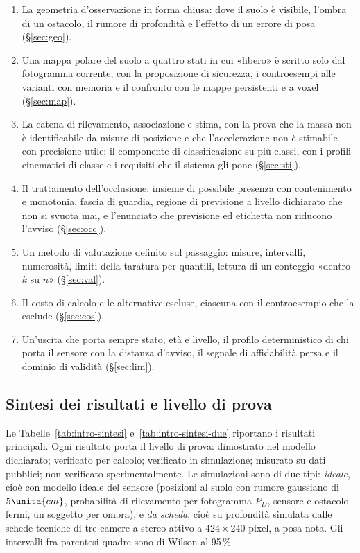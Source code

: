 \begin{enumerate}[label=\arabic*.]
\item La geometria d'osservazione in forma chiusa: dove il suolo è visibile, l'ombra di un ostacolo, il rumore di profondità e l'effetto di un errore di posa (\S\ref{sec:geo}).
\item Una mappa polare del suolo a quattro stati in cui «libero» è scritto solo dal fotogramma corrente, con la proposizione di sicurezza, i controesempi alle varianti con memoria e il confronto con le mappe persistenti e a voxel (\S\ref{sec:map}).
\item La catena di rilevamento, associazione e stima, con la prova che la massa non è identificabile da misure di posizione e che l'accelerazione non è stimabile con precisione utile; il componente di classificazione su più classi, con i profili cinematici di classe e i requisiti che il sistema gli pone (\S\ref{sec:sti}).
\item Il trattamento dell'occlusione: insieme di possibile presenza con contenimento e monotonia, fascia di guardia, regione di previsione a livello dichiarato che non si svuota mai, e l'enunciato che previsione ed etichetta non riducono l'avviso (\S\ref{sec:occ}).
\item Un metodo di valutazione definito sul passaggio: misure, intervalli, numerosità, limiti della taratura per quantili, lettura di un conteggio «dentro $k$ su $n$» (\S\ref{sec:val}).
\item Il costo di calcolo e le alternative escluse, ciascuna con il controesempio che la esclude (\S\ref{sec:cos}).
\item Un'uscita che porta sempre stato, età e livello, il profilo deterministico di chi porta il sensore con la distanza d'avviso, il segnale di affidabilità persa e il dominio di validità (\S\ref{sec:lim}).
\end{enumerate}

\subsection{Sintesi dei risultati e livello di prova}\label{sec:intro-sintesi}

Le Tabelle~\ref{tab:intro-sintesi} e~\ref{tab:intro-sintesi-due} riportano i risultati principali. Ogni risultato porta il livello di prova:  dimostrato nel modello dichiarato;  verificato per calcolo;  verificato in simulazione;  misurato su dati pubblici;  non verificato sperimentalmente. Le simulazioni sono di due tipi: \emph{ideale}, cioè con modello ideale del sensore (posizioni al suolo con rumore gaussiano di $5\unita{cm}$, probabilità di rilevamento per fotogramma $P_D$, sensore e ostacolo fermi, un soggetto per ombra), e \emph{da scheda}, cioè su profondità simulata dalle schede tecniche di tre camere a stereo attivo a $424\times240$ pixel, a posa nota. Gli intervalli fra parentesi quadre sono di Wilson al 95\,\%.

